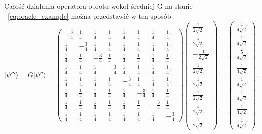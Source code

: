Całość działania operatora obrotu wokół średniej G na stanie ~\eqref{eq:oracle_example} można przedstawić w ten sposób \cite[s.~278, wz.~(5.368)]{inf_kwant}
\begin{equation}
\label{eq:matrix_example} 
|\psi'''\rangle = G|\psi''\rangle =
\begin{pmatrix}
-\frac{3}{4} & \frac{1}{4} & \frac{1}{4} & \frac{1}{4} & \frac{1}{4} & \frac{1}{4} & \frac{1}{4} & \frac{1}{4} \\
\frac{1}{4} & -\frac{3}{4} & \frac{1}{4} & \frac{1}{4} & \frac{1}{4} & \frac{1}{4} & \frac{1}{4} & \frac{1}{4} \\
\frac{1}{4} & \frac{1}{4} & -\frac{3}{4} & \frac{1}{4} & \frac{1}{4} & \frac{1}{4} & \frac{1}{4} & \frac{1}{4} \\
\frac{1}{4} & \frac{1}{4} & \frac{1}{4} & -\frac{3}{4} & \frac{1}{4} & \frac{1}{4} & \frac{1}{4} & \frac{1}{4} \\
\frac{1}{4} & \frac{1}{4} & \frac{1}{4} & \frac{1}{4} & -\frac{3}{4} & \frac{1}{4} & \frac{1}{4} & \frac{1}{4} \\
\frac{1}{4} & \frac{1}{4} & \frac{1}{4} & \frac{1}{4} & \frac{1}{4} & -\frac{3}{4} & \frac{1}{4} & \frac{1}{4} \\
\frac{1}{4} & \frac{1}{4} & \frac{1}{4} & \frac{1}{4} & \frac{1}{4} & \frac{1}{4} & -\frac{3}{4} & \frac{1}{4} \\
\frac{1}{4} & \frac{1}{4} & \frac{1}{4} & \frac{1}{4} & \frac{1}{4} & \frac{1}{4} & \frac{1}{4} & -\frac{3}{4}
\end{pmatrix}
\begin{pmatrix}
\frac{1}{2\sqrt{2}}\\
\frac{1}{2\sqrt{2}}\\
-\frac{1}{2\sqrt{2}}\\
\frac{1}{2\sqrt{2}}\\
\frac{1}{2\sqrt{2}}\\
\frac{1}{2\sqrt{2}}\\
\frac{1}{2\sqrt{2}}\\
\frac{1}{2\sqrt{2}}
\end{pmatrix}
=
\begin{pmatrix}
\frac{1}{4\sqrt{2}}\\
\frac{1}{4\sqrt{2}}\\
\frac{5}{4\sqrt{2}}\\
\frac{1}{4\sqrt{2}}\\
\frac{1}{4\sqrt{2}}\\
\frac{1}{4\sqrt{2}}\\
\frac{1}{4\sqrt{2}}\\
\frac{1}{4\sqrt{2}}
\end{pmatrix}.
\end{equation}

